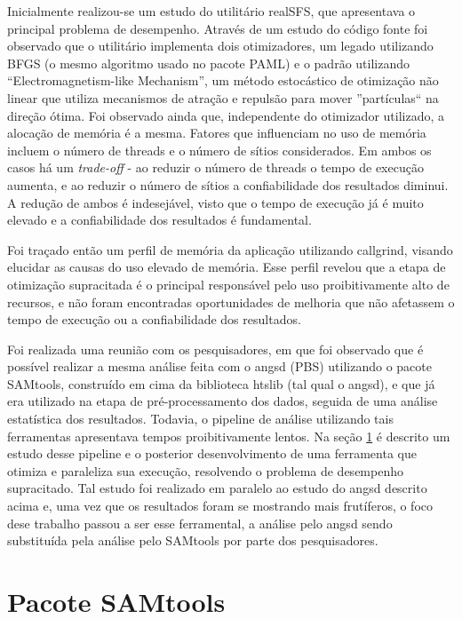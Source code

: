 \documentclass[cic,tc]{iiufrgs}
\begin{document}
Inicialmente realizou-se um estudo do utilitário realSFS, que apresentava o
principal problema de desempenho. Através de um estudo do código fonte foi
observado que o utilitário implementa dois otimizadores, um legado utilizando
BFGS (o mesmo algoritmo usado no pacote PAML) e o padrão utilizando
``Electromagnetism-like Mechanism'', um método estocástico de otimização
não linear que utiliza mecanismos de atração e repulsão para mover
''partículas`` na direção ótima.\cite{5636954} Foi observado ainda que,
independente do otimizador utilizado, a alocação de memória é a mesma. Fatores
que influenciam no uso de memória incluem o número de threads e o número de
sítios considerados. Em ambos os casos há um \textit{trade-off} - ao reduzir o
número de threads o tempo de execução aumenta, e ao reduzir o número de sítios
a confiabilidade dos resultados diminui.\cite{popgen2016angsd} A redução de
ambos é indesejável, visto que o tempo de execução já é muito elevado e a
confiabilidade dos resultados é fundamental.

Foi traçado então um perfil de memória da aplicação utilizando callgrind,
visando elucidar as causas do uso elevado de memória. Esse perfil revelou que a
etapa de otimização supracitada é o principal responsável pelo uso
proibitivamente alto de recursos, e não foram encontradas oportunidades de
melhoria que não afetassem o tempo de execução ou a confiabilidade dos
resultados.

Foi realizada uma reunião com os pesquisadores, em que foi observado que é
possível realizar a mesma análise feita com o angsd (PBS) utilizando o pacote
SAMtools, construído em cima da biblioteca htslib (tal qual o angsd), e que já
era utilizado na etapa de pré-processamento dos dados, seguida de uma análise
estatística dos resultados. Todavia, o pipeline de análise utilizando tais
ferramentas apresentava tempos proibitivamente lentos. Na seção
\ref{sec:SAMtools} é descrito um estudo desse pipeline e o posterior
desenvolvimento de uma ferramenta que otimiza e paraleliza sua execução,
resolvendo o problema de desempenho supracitado. Tal estudo foi realizado em
paralelo ao estudo do angsd descrito acima e, uma vez que os resultados foram
se mostrando mais frutíferos, o foco dese trabalho passou a ser esse
ferramental, a análise pelo angsd sendo substituída pela análise pelo SAMtools
por parte dos pesquisadores.

\section{Pacote SAMtools}
\label{sec:SAMtools}
\end{document}
